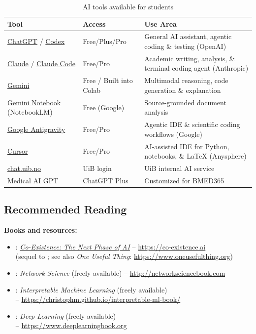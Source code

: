 \documentclass[11pt,a4paper]{article}
\begin{document}
\begin{table}[htbp]
\centering
\caption{AI tools available for students}
\label{tab:aitools}
\begin{tabular}{@{}llp{5.5cm}@{}}
\toprule
\textbf{Tool} & \textbf{Access} & \textbf{Use Area} \\
\midrule
\href{https://chatgpt.com}{ChatGPT} / \href{https://openai.com/codex/}{Codex} & Free/Plus/Pro & General AI assistant, agentic coding \& testing (OpenAI) \\
\href{https://claude.ai}{Claude} / \href{https://claude.ai/code}{Claude Code} & Free/Pro & Academic writing, analysis, \& terminal coding agent (Anthropic) \\
\href{https://gemini.google.com}{Gemini} & Free / Built into Colab & Multimodal reasoning, code generation \& explanation \\
\href{https://notebook.google.com}{Gemini Notebook} {\small(NotebookLM)} & Free (Google) & Source-grounded document analysis \\
\href{https://antigravity.google}{Google Antigravity} & Free/Pro & Agentic IDE \& scientific coding workflows (Google) \\
\href{https://cursor.com}{Cursor} & Free/Pro & AI-assisted IDE for Python, notebooks, \& LaTeX (Anysphere) \\
\href{https://chat.uib.no}{chat.uib.no} & UiB login & UiB internal AI service \\
Medical AI GPT & ChatGPT Plus & Customized for BMED365 \\
\bottomrule
\end{tabular}
\end{table}

\newpage
\subsection{Recommended Reading}

\textbf{Books and resources:}
\begin{itemize}[nosep]
    \item \citet{mollick2026coexistence}: \href{https://www.penguinrandomhouse.com/books/813026/co-existence-by-ethan-mollick/}{\emph{Co-Existence: The Next Phase of AI}} -- \url{https://co-existence.ai} \\ {\small(sequel to \citet{mollick2024cointelligence}; see also \emph{One Useful Thing}: \url{https://www.oneusefulthing.org})}
    \item \citet{barabasi2016network}: \emph{Network Science} (freely available) -- \url{http://networksciencebook.com}
    \item \citet{molnar2022interpretable}: \emph{Interpretable Machine Learning} (freely available) \\ -- \url{https://christophm.github.io/interpretable-ml-book/}
    \item \citet{goodfellow2016deep}: \emph{Deep Learning} (freely available) \\ -- \url{https://www.deeplearningbook.org}
\end{itemize}
\end{document}
